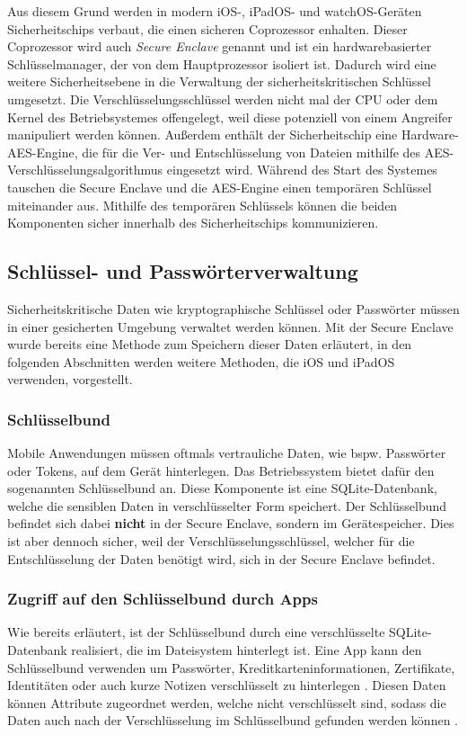 Aus diesem Grund werden in modern iOS-, iPadOS- und watchOS-Geräten Sicherheitschips verbaut, die einen sicheren
Coprozessor enhalten. Dieser Coprozessor wird auch \textit{Secure Enclave} genannt und ist ein hardwarebasierter 
Schlüsselmanager, der von dem Hauptprozessor isoliert ist. Dadurch wird eine weitere Sicherheitsebene in die 
Verwaltung der sicherheitskritischen Schlüssel umgesetzt. Die Verschlüsselungsschlüssel werden nicht mal
der CPU oder dem Kernel des Betriebsystemes offengelegt, weil diese potenziell von einem Angreifer manipuliert
werden können. Außerdem enthält der Sicherheitschip eine Hardware-AES-Engine, die für die Ver- und Entschlüsselung
von Dateien mithilfe des AES-Verschlüsselungsalgorithmus eingesetzt wird. Während des Start des Systemes tauschen
die Secure Enclave und die AES-Engine einen temporären Schlüssel miteinander aus. Mithilfe des temporären Schlüssels
können die beiden Komponenten sicher innerhalb des Sicherheitschips kommunizieren. \cite{apple2020hardware_security} \cite{apple2020} \\

\subsection{Schlüssel- und Passwörterverwaltung}
Sicherheitskritische Daten wie kryptographische Schlüssel oder Passwörter müssen in einer gesicherten Umgebung
verwaltet werden können. Mit der Secure Enclave wurde bereits eine Methode zum Speichern dieser Daten erläutert, 
in den folgenden Abschnitten werden weitere Methoden, die iOS und iPadOS verwenden, vorgestellt. \cite{apple2020}

\subsubsection{Schlüsselbund}
Mobile Anwendungen müssen oftmals vertrauliche Daten, wie bspw. Passwörter oder Tokens, auf dem Gerät hinterlegen. 
Das Betriebssystem bietet dafür den sogenannten Schlüsselbund an. Diese Komponente ist eine SQLite-Datenbank,
welche die sensiblen Daten in verschlüsselter Form speichert. Der Schlüsselbund befindet sich dabei \textbf{nicht} in der
Secure Enclave, sondern im Gerätespeicher. Dies ist aber dennoch sicher, weil der Verschlüsselungsschlüssel, welcher
für die Entschlüsselung der Daten benötigt wird, sich in der Secure Enclave befindet. \cite{apple2020}

\subsubsection{Zugriff auf den Schlüsselbund durch Apps}
Wie bereits erläutert, ist der Schlüsselbund durch eine verschlüsselte SQLite-Datenbank realisiert, die im Dateisystem hinterlegt ist. Eine App kann den Schlüsselbund verwenden um Passwörter, Kreditkarteninformationen, Zertifikate, Identitäten oder auch kurze Notizen verschlüsselt zu hinterlegen \cite{apple2020keychain_services}.
Diesen Daten können Attribute zugeordnet werden, welche nicht verschlüsselt sind, sodass die Daten auch nach der Verschlüsselung im Schlüsselbund gefunden werden können \cite{apple2020keychain_items}. 

